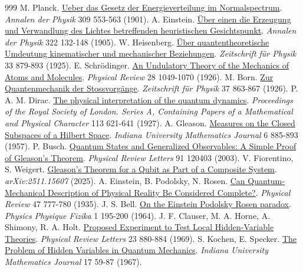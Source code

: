 \begin{thebibliography}{999}
 M. Planck. \href{https://doi.org/10.1002/andp.19013090310}{Ueber das Gesetz der Energieverteilung im Normalspectrum}. \emph{Annalen der Physik} 309 553-563 (1901).
 A. Einstein. \href{https://doi.org/10.1002/andp.19053220607}{Über einen die Erzeugung und Verwandlung des Lichtes betreffenden heuristischen Gesichtspunkt}. \emph{Annalen der Physik} 322 132-148 (1905).
 W. Heisenberg. \href{https://doi.org/10.1007/BF01328377}{Über quantentheoretische Umdeutung kinematischer und mechanischer Beziehungen}. \emph{Zeitschrift für Physik} 33 879-893 (1925).
 E. Schrödinger. \href{https://doi.org/10.1103/PhysRev.28.1049}{An Undulatory Theory of the Mechanics of Atoms and Molecules}. \emph{Physical Review} 28 1049-1070 (1926).
 M. Born. \href{https://doi.org/10.1007/BF01397477}{Zur Quantenmechanik der Stossvorgänge}. \emph{Zeitschrift für Physik} 37 863-867 (1926).
 P. A. M. Dirac. \href{https://doi.org/10.1098/rspa.1927.0012}{The physical interpretation of the quantum dynamics}. \emph{Proceedings of the Royal Society of London. Series A, Containing Papers of a Mathematical and Physical Character} 113 621-641 (1927).
 A. Gleason. \href{https://doi.org/10.1512/iumj.1957.6.56050}{Measures on the Closed Subspaces of a Hilbert Space}. \emph{Indiana University Mathematics Journal} 6 885-893 (1957).
 P. Busch. \href{https://doi.org/10.1103/PhysRevLett.91.120403}{Quantum States and Generalized Observables: A Simple Proof of Gleason's Theorem}. \emph{Physical Review Letters} 91 120403 (2003).
 V. Fiorentino, S. Weigert. \href{https://arxiv.org/abs/2511.15607}{Gleason's Theorem for a Qubit as Part of a Composite System}. \emph{arXiv:2511.15607}  (2025).
 A. Einstein, B. Podolsky, N. Rosen. \href{https://doi.org/10.1103/PhysRev.47.777}{Can Quantum-Mechanical Description of Physical Reality Be Considered Complete?}. \emph{Physical Review} 47 777-780 (1935).
 J. S. Bell. \href{https://doi.org/10.1103/PhysicsPhysiqueFizika.1.195}{On the Einstein Podolsky Rosen paradox}. \emph{Physics Physique Fizika} 1 195-200 (1964).
 J. F. Clauser, M. A. Horne, A. Shimony, R. A. Holt. \href{https://doi.org/10.1103/PhysRevLett.23.880}{Proposed Experiment to Test Local Hidden-Variable Theories}. \emph{Physical Review Letters} 23 880-884 (1969).
 S. Kochen, E. Specker. \href{https://doi.org/10.1512/iumj.1968.17.17004}{The Problem of Hidden Variables in Quantum Mechanics}. \emph{Indiana University Mathematics Journal} 17 59-87 (1967).

\end{thebibliography}
